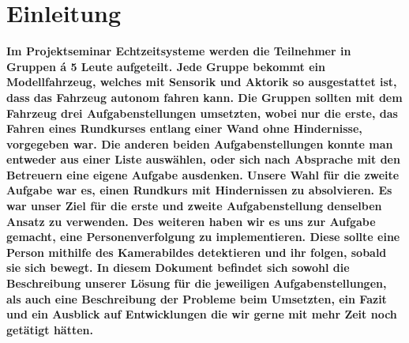 \section{Einleitung}
\label{sec:einleitung}
\textbf{Im Projektseminar Echtzeitsysteme werden die Teilnehmer in Gruppen \'{a} 5 Leute aufgeteilt. Jede Gruppe bekommt ein Modellfahrzeug, welches mit Sensorik und Aktorik so ausgestattet ist, dass das Fahrzeug autonom fahren kann. Die Gruppen sollten mit dem Fahrzeug drei Aufgabenstellungen umsetzten, wobei nur die erste, das Fahren eines Rundkurses entlang einer Wand ohne Hindernisse, vorgegeben war. Die anderen beiden Aufgabenstellungen konnte man entweder aus einer Liste ausw\"ahlen, oder sich nach Absprache mit den Betreuern eine eigene Aufgabe ausdenken. Unsere Wahl f\"ur die zweite Aufgabe war es, einen Rundkurs mit Hindernissen zu absolvieren. Es war unser Ziel f\"ur die erste und zweite Aufgabenstellung denselben Ansatz zu verwenden. Des weiteren haben wir es uns zur Aufgabe gemacht, eine Personenverfolgung zu implementieren. Diese sollte eine Person mithilfe des Kamerabildes detektieren und ihr folgen, sobald sie sich bewegt. In diesem Dokument befindet sich sowohl die Beschreibung unserer Lösung f\"ur die jeweiligen Aufgabenstellungen, als auch eine Beschreibung der Probleme beim Umsetzten, ein Fazit und ein Ausblick auf Entwicklungen die wir gerne mit mehr Zeit noch get\"atigt h\"atten.}
